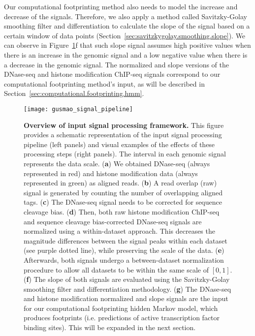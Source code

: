 Our computational footprinting method also needs to model the increase and decrease of the signals. Therefore, we also apply a method called Savitzky-Golay smoothing filter and differentiation to calculate the slope of the signal based on a certain window of data points (Section~\ref{sec:savitzkygolay.smoothing.slope}). We can observe in Figure~\ref{fig:gusmao_signal_pipeline}f that such slope signal assumes high positive values when there is an increase in the genomic signal and a low negative value when there is a decrease in the genomic signal. The normalized and slope versions of the DNase-seq and histone modification ChIP-seq signals correspond to our computational footprinting method's input, as will be described in Section~\ref{sec:computational.footprinting.hmm}.

\begin{figure}[h!]
\centering
\texttt{[image: gusmao\_signal\_pipeline]}
\caption[Overview of input signal processing framework]{\textbf{Overview of input signal processing framework.} This figure provides a schematic representation of the input signal processing pipeline (left panels) and visual examples of the effects of these processing steps (right panels). The interval in each genomic signal represents the data scale. (\textbf{a}) We obtained DNase-seq (always represented in red) and histone modification data (always represented in green) as aligned reads. (\textbf{b}) A read overlap (raw) signal is generated by counting the number of overlapping aligned tags. (\textbf{c}) The DNase-seq signal needs to be corrected for sequence cleavage bias. (\textbf{d}) Then, both raw histone modification ChIP-seq and sequence cleavage bias-corrected DNase-seq signals are normalized using a within-dataset approach. This decreases the magnitude differences between the signal peaks within each dataset (see purple dotted line), while preserving the scale of the data. (\textbf{e}) Afterwards, both signals undergo a between-dataset normalization procedure to allow all datasets to be within the same scale of $[0, 1]$. (\textbf{f}) The slope of both signals are evaluated using the Savitzky-Golay smoothing filter and differentiation methodology. (\textbf{g}) The DNase-seq and histone modification normalized and slope signals are the input for our computational footprinting hidden Markov model, which produces footprints (i.e. predictions of active transcription factor binding sites). This will be expanded in the next section.}
\label{fig:gusmao_signal_pipeline}
\end{figure}

